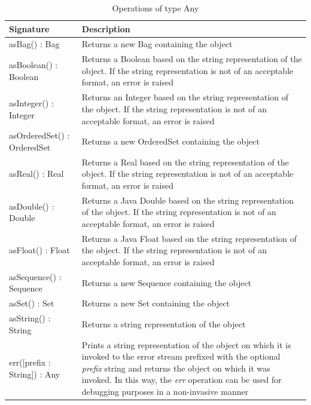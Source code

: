 \begin{longtabu} {|p{6.5cm}|X|}
\caption{Operations of type Any}
\label{tab:AnyOperations}\\
\hline
    \textbf{Signature} & \textbf{Description} \\\hline

    asBag() : Bag & Returns a new Bag containing the object \\\hline
    
    asBoolean() : Boolean & Returns a Boolean based on the string representation of the object. If the string representation is not of an acceptable format, an error is raised \\\hline
    
    asInteger() : Integer & Returns an Integer based on the string representation of the object. If the string representation is not of an acceptable format, an error is raised \\\hline
    
    asOrderedSet() : OrderedSet & Returns a new OrderedSet containing the object \\\hline
    
    asReal() : Real & Returns a Real based on the string representation of the object. If the string representation is not of an acceptable format, an error is raised \\\hline

    asDouble() : Double & Returns a Java Double based on the string representation of the object. If the string representation is not of an acceptable format, an error is raised \\\hline
    
    asFloat() : Float & Returns a Java Float based on the string representation of the object. If the string representation is not of an acceptable format, an error is raised \\\hline
        
    asSequence() : Sequence & Returns a new Sequence containing the object \\\hline
    
    asSet() : Set & Returns a new Set containing the object \\\hline
    
    asString() : String & Returns a string representation of the object \\\hline
    
    err([prefix : String]) : Any & Prints a string representation of the object on which it is invoked to the error stream prefixed with the optional \emph{prefix} string and returns the object on which it was invoked. In this way, the \emph{err} operation can be used for debugging purposes in a non-invasive manner\\\hline
    

\end{longtabu}
